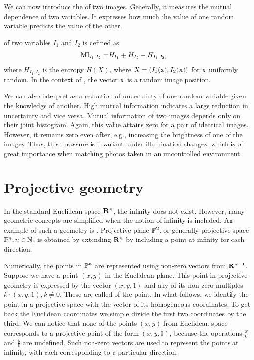We can now introduce the  of two images. 
Generally, it measures the mutual dependence of two variables. 
It expresses how much the value of one random variable predicts the value of the other.
\begin{definition}
 of two variables $I_1$ and $I_2$ is defined as
\begin{align*}
\MI{I_1, I_2} = & \H{I_1} + \H{I_2} - \H{I_1, I_2},
\end{align*}  
where $H_{I_1, I_2}$ is the entropy $H(X)$, where $X = (I_1(\x), I_2(\x))$ for $\x$ uniformly random. 
In the context of \cv, the vector $\x$ is a random image position. 
\end{definition}
We can also interpret  as a reduction of uncertainty of one random variable given the knowledge of another.
High mutual information indicates a large reduction in uncertainty and vice versa. 
Mutual information of two images depends only on their joint histogram. 
Again, this value attains zero for a pair of identical images. 
However, it remains zero even after, e.g., increasing the brightness of one of the images. 
Thus, this meassure is invariant under illumination changes, which is of great importance when matching photos taken in an uncontrolled environment. 

\section{Projective geometry}
\label{sec:projective}

In the standard Euclidean space $\R^n$, the infinity does not exist.
However, many geometric concepts are simplified when the notion of infinity is included.
An example of such a geometry is .
Projective plane $\P^2$, or generally projective space $\P^n, n \in \N$, is obtained by extending $\R^n$ by including a point at infinity for each direction.

Numerically, the points in $\P^n$ are represented using non-zero vectors from $\R^{n+1}$.
Suppose we have a point $(x, y)$ in the Euclidean plane.
This point in projective geometry is expressed by the vector $(x, y, 1)$ and any of its non-zero multiples $k \cdot (x, y, 1), k \neq 0$.
These are called  of the point.
In what follows, we identify the point in a projective space with the vector of its homogeneous coordinates. 
To get back the Euclidean coordinates we simple divide the first two coordinates by the third.
We can notice that none of the points $(x, y)$ from Euclidean space corresponds to a projective point of the form $(x, y, 0)$, because the operations $\frac{x}{0}$ and $\frac{y}{0}$ are undefined.
Such non-zero vectors are used to represent the points at infinity, with each corresponding to a particular direction. 

